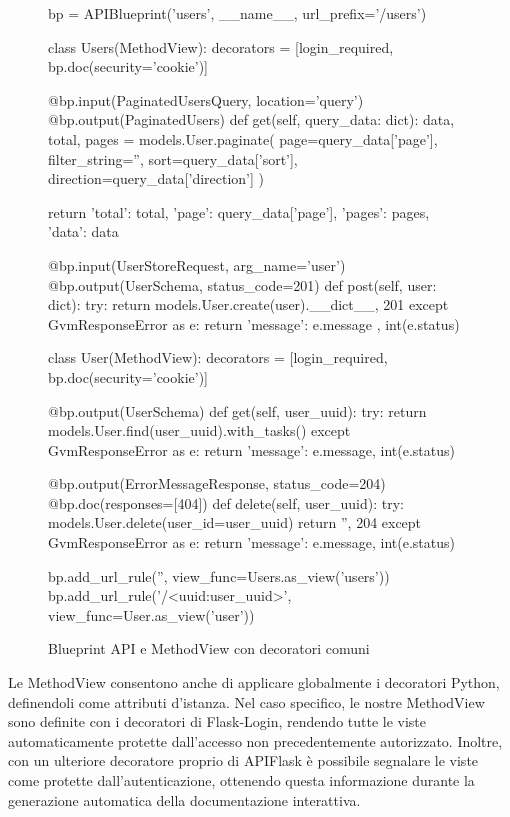\begin{figure}
\begin{pycode}
bp = APIBlueprint('users', __name__, url_prefix='/users')

class Users(MethodView):
    decorators = [login_required, bp.doc(security='cookie')]
    
    @bp.input(PaginatedUsersQuery, location='query')
    @bp.output(PaginatedUsers)
    def get(self, query_data: dict):
        data, total, pages = models.User.paginate(
            page=query_data['page'],
            filter_string='',
            sort=query_data['sort'],
            direction=query_data['direction']
        )
    
        return {
            'total': total,
            'page': query_data['page'],
            'pages': pages,
            'data': data
        }
    
    @bp.input(UserStoreRequest, arg_name='user')
    @bp.output(UserSchema, status_code=201)
    def post(self, user: dict):
        try:
            return models.User.create(user).__dict__, 201
        except GvmResponseError as e:
            return {
                'message': e.message
            }, int(e.status)
    
    
class User(MethodView):
    decorators = [login_required, bp.doc(security='cookie')]
    
    @bp.output(UserSchema)
    def get(self, user_uuid):
        try:
            return models.User.find(user_uuid).with_tasks()
        except GvmResponseError as e:
            return {'message': e.message}, int(e.status)
    
    @bp.output(ErrorMessageResponse, status_code=204)
    @bp.doc(responses=[404])
    def delete(self, user_uuid):
        try:
            models.User.delete(user_id=user_uuid)
            return '', 204
        except GvmResponseError as e:
            return {'message': e.message}, int(e.status)


bp.add_url_rule('', view_func=Users.as_view('users'))
bp.add_url_rule('/<uuid:user_uuid>', view_func=User.as_view('user'))
\end{pycode}
\caption{Blueprint API e MethodView con decoratori comuni}
\end{figure}

Le MethodView consentono anche di applicare globalmente i decoratori Python, definendoli come attributi d'istanza. Nel caso specifico, le nostre MethodView sono definite con i decoratori di Flask-Login, rendendo tutte le viste automaticamente protette dall'accesso non precedentemente autorizzato. Inoltre, con un ulteriore decoratore proprio di APIFlask è possibile segnalare le viste come protette dall'autenticazione, ottenendo questa informazione durante la generazione automatica della documentazione interattiva.

